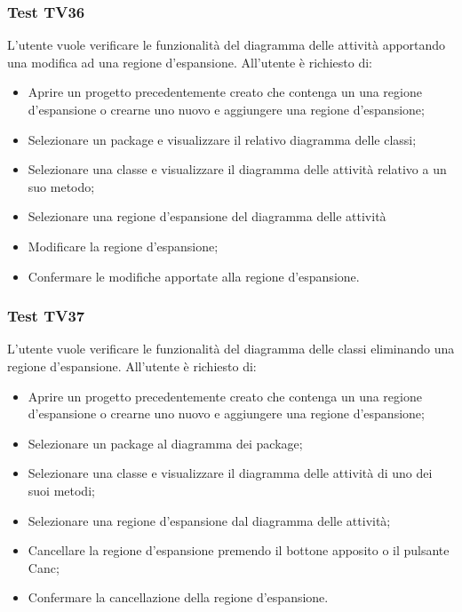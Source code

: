 \documentclass[../PianoDiQualifica.tex]{subfiles}
\begin{document}
	\subsubsection{Test TV36} 
	L'utente vuole verificare le funzionalità del diagramma delle attività apportando una modifica ad una regione d'espansione. 
	All'utente è richiesto di: 
	\begin{itemize} 
		\item Aprire un progetto precedentemente creato che contenga un una regione d'espansione o crearne uno nuovo e aggiungere una regione d'espansione;
		\item Selezionare un package e visualizzare il relativo diagramma delle classi; 
		\item Selezionare una classe e visualizzare il diagramma delle attività relativo a un suo metodo; 
		\item Selezionare una regione d'espansione del diagramma delle attività 
		\item Modificare la regione d'espansione;%
		\item Confermare le modifiche apportate alla regione d'espansione. 
	\end{itemize} 
	
	
	\subsubsection{Test TV37} 
	L'utente vuole verificare le funzionalità del diagramma delle classi eliminando una regione d'espansione. 
	All'utente è richiesto di: 
	\begin{itemize} 
		\item Aprire un progetto precedentemente creato che contenga un una regione d'espansione o crearne uno nuovo e aggiungere una regione d'espansione;
		\item Selezionare un package al diagramma dei package; 
		\item Selezionare una classe e visualizzare il diagramma delle attività di uno dei suoi metodi; 
		\item Selezionare una regione d'espansione dal diagramma delle attività; 
		\item Cancellare la regione d'espansione premendo il bottone apposito o il pulsante Canc; 
		\item Confermare la cancellazione della regione d'espansione. 
	\end{itemize} 
	
	
	
	
\end{document}
